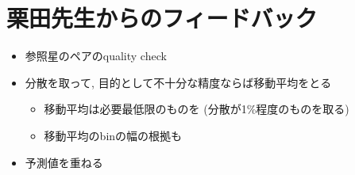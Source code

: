 \documentclass[dvipdfmx,a4paper]{jsarticle}
\begin{document}
\section{栗田先生からのフィードバック}
\begin{itemize}
  \item 参照星のペアのquality check
  \item 分散を取って, 目的として不十分な精度ならば移動平均をとる
  \begin{itemize}
    \item 移動平均は必要最低限のものを (分散が1\%程度のものを取る)
    \item 移動平均のbinの幅の根拠も
  \end{itemize}
  \item 予測値を重ねる
\end{itemize}
\end{document}
